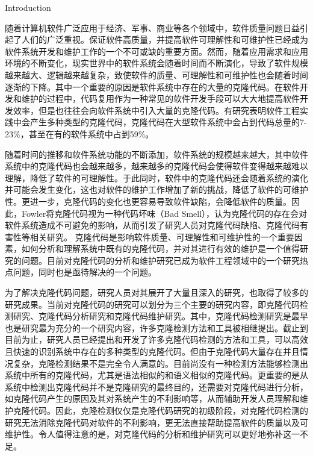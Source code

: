 
{Introduction}



随着计算机软件广泛应用于经济、军事、商业等各个领域中，软件质量问题日益引起了人们的广泛重视。保证软件高质量，并提高软件可理解性和可维护性已经成为软件系统开发和维护工作的一个不可或缺的重要方面。然而，随着应用需求和应用环境的不断变化，现实世界中的软件系统会随着时间而不断演化，导致了软件规模越来越大、逻辑越来越复杂，致使软件的质量、可理解性和可维护性也会随着时间逐渐的下降。其中一个重要的原因是软件系统中存在的大量的克隆代码。在软件开发和维护的过程中，代码复用作为一种常见的软件开发手段可以大大地提高软件开发效率，但是也往往会向软件系统中引入大量的克隆代码。有研究表明软件工程实践中会产生多种类型的克隆代码\cite{roy2007survey}，克隆代码在大型软件系统中会占到代码总量的7-23\%\cite{baker1995finding}\cite{kontogiannis1996pattern}\cite{lague1997assessing}，甚至在有的软件系统中占到59\%\cite{ducasse1999language}。

随着时间的推移和软件系统功能的不断添加，软件系统的规模越来越大，其中软件系统中的克隆代码也会越来越多，越来越多的克隆代码会使得软件变得越来越难以理解，降低了软件的可理解性。于此同时，软件中的克隆代码还会随着系统的演化并可能会发生变化，这也对软件的维护工作增加了新的挑战，降低了软件的可维护性。更进一步，克隆代码的变化也更容易导致软件缺陷，会降低软件的质量。因此，Fowler将克隆代码视为一种代码坏味（Bad Smell）\cite{fowler2009refactoring}，认为克隆代码的存在会对软件系统造成不可避免的影响，从而引发了研究人员对克隆代码缺陷\cite{juergens2009code}\cite{gauthier2013uncovering}\cite{wagner2016relationship}、克隆代码有害性\cite{kapser2008cloning}\cite{selim2010studying}\cite{wang2012can}等相关研究。
克隆代码是影响软件质量、可理解性和可维护性的一个重要因素，如何分析和理解系统中既有的克隆代码，并对其进行有效的维护是一个值得研究的问题。目前对克隆代码的分析和维护研究已成为软件工程领域中的一个研究热点问题，同时也是亟待解决的一个问题。

为了解决克隆代码问题，研究人员对其展开了大量且深入的研究，也取得了较多的研究成果。当前对克隆代码的研究可以划分为三个主要的研究内容，即克隆代码检测研究、克隆代码分析研究和克隆代码维护研究。其中，克隆代码检测研究是最早也是研究最为充分的一个研究内容，许多克隆检测方法和工具被相继提出。截止到目前为止，研究人员已经提出和开发了许多克隆代码检测的方法和工具\cite{roy2008nicad}\cite{kamiya2002ccfinder}\cite{jiang2007deckard}，可以高效且快速的识别系统中存在的多种类型的克隆代码。但由于克隆代码大量存在并且情况复杂，克隆检测结果不是完全令人满意的。目前尚没有一种检测方法能够检测出系统中所有的克隆代码，尤其是语法相似的和语义相似的克隆代码。更重要的是从系统中检测出克隆代码并不是克隆研究的最终目的，还需要对克隆代码进行分析，如克隆代码产生的原因及其对系统产生的不利影响等，从而辅助开发人员理解和维护克隆代码。因此，克隆检测仅仅是克隆代码研究的初级阶段，对克隆代码检测的研究无法消除克隆代码对软件的不利影响，更无法直接帮助提高软件的质量以及可维护性。令人值得注意的是，对克隆代码的分析和维护研究可以更好地弥补这一不足。

